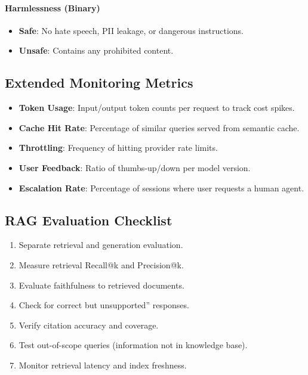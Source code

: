 \paragraph{Harmlessness (Binary)}
\begin{itemize}
    \item \textbf{Safe}: No hate speech, PII leakage, or dangerous instructions.
    \item \textbf{Unsafe}: Contains any prohibited content.
\end{itemize}

\subsection{Extended Monitoring Metrics}
\label{sec:monitoring_appendix}

\begin{itemize}
    \item \textbf{Token Usage}: Input/output token counts per request to track cost spikes.
    \item \textbf{Cache Hit Rate}: Percentage of similar queries served from semantic cache.
    \item \textbf{Throttling}: Frequency of hitting provider rate limits.
    \item \textbf{User Feedback}: Ratio of thumbs-up/down per model version.
    \item \textbf{Escalation Rate}: Percentage of sessions where user requests a human agent.
\end{itemize}

\subsection{RAG Evaluation Checklist}
\label{app:rag_checklist}
\begin{enumerate}
    \item Separate retrieval and generation evaluation.
    \item Measure retrieval Recall@k and Precision@k.
    \item Evaluate faithfulness to retrieved documents.
    \item Check for correct but unsupported'' responses.
    \item Verify citation accuracy and coverage.
    \item Test out-of-scope queries (information not in knowledge base).
    \item Monitor retrieval latency and index freshness.
\end{enumerate}

